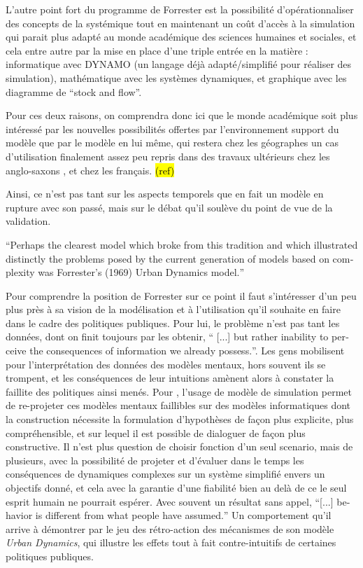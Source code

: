 L'autre point fort du programme de Forrester est la possibilité d'opérationnaliser des concepts de la systémique tout en maintenant un coût d'accès à la simulation qui parait plus adapté au monde académique des sciences humaines et sociales, et cela entre autre par la mise en place d'une triple entrée en la matière : informatique avec DYNAMO (un langage déjà adapté/simplifié pour réaliser des simulation), mathématique avec les systèmes dynamiques, et graphique avec les diagramme de \enquote{stock and flow}.

Pour ces deux raisons, on comprendra donc ici que le monde académique soit plus intéressé par les nouvelles possibilités offertes par l'environnement support du modèle que par le modèle en lui même, qui restera chez les géographes un cas d'utilisation finalement assez peu repris dans des travaux ultérieurs chez les anglo-saxons \autocite[308]{Batty1976}, et chez les français. \hl{(ref)}

Ainsi, ce n'est pas tant sur les aspects temporels que \textcite{Batty2001} en fait un modèle en rupture avec son passé, mais sur le débat qu'il soulève du point de vue de la validation.

\foreignquote{english}{Perhaps the clearest model which broke from this tradition and which illustrated distinctly the problems posed by the current generation of models based on complexity was Forrester’s (1969) Urban Dynamics model.}\autocite{Batty2001}

Pour comprendre la position de Forrester sur ce point il faut s'intéresser d'un peu plus près à sa vision de la modélisation et à l'utilisation qu'il souhaite en faire dans le cadre des politiques publiques. Pour lui, le problème n'est pas tant les données, dont on finit toujours par les obtenir, \foreignquote{english}{ [...] but rather inability to perceive the consequences of information we already possess.}. Les gens mobilisent pour l'interprétation des données des modèles mentaux, hors souvent ils se trompent, et les conséquences de leur intuitions amènent alors à constater la faillite des politiques ainsi menés. Pour \textcite{Forrester1971}, l'usage de modèle de simulation permet de re-projeter ces modèles mentaux faillibles sur des modèles informatiques dont la construction nécessite la formulation d'hypothèses de façon plus explicite, plus compréhensible, et sur lequel il est possible de dialoguer de façon plus constructive. Il n'est plus question de choisir fonction d'un seul scenario, mais de plusieurs, avec la possibilité de projeter et d'évaluer dans le temps les conséquences de dynamiques complexes sur un système simplifié envers un objectifs donné, et cela avec la garantie d'une fiabilité bien au delà de ce le seul esprit humain ne pourrait espérer. Avec souvent un résultat sans appel, \foreignquote{english}{[...] behavior is different from what people have assumed.} Un comportement qu'il arrive à démontrer par le jeu des rétro-action des mécanismes de son modèle \textit{Urban Dynamics}, qui illustre les effets tout à fait contre-intuitifs de certaines politiques publiques.

